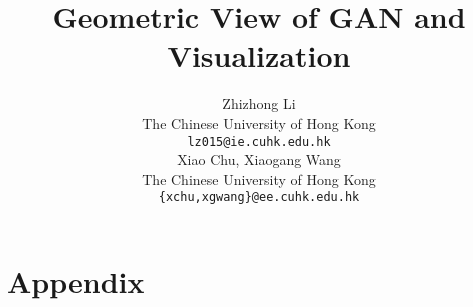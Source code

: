 \documentclass{article}
\title{Geometric View of GAN and Visualization}
\author{
    Zhizhong Li \\
    The Chinese University of Hong Kong\\
    \texttt{lz015@ie.cuhk.edu.hk} \\
     \And
     Xiao Chu, Xiaogang Wang \\
     The Chinese University of Hong Kong \\
     \texttt{\{xchu,xgwang\}@ee.cuhk.edu.hk} \\
}
\begin{document}
\maketitle












\clearpage
\section*{Appendix}
\end{document}
